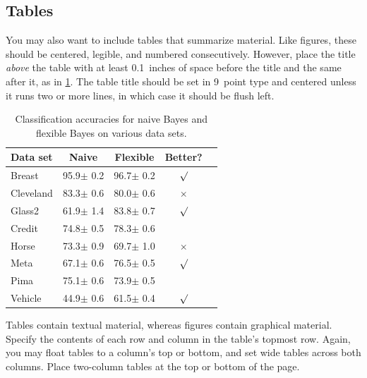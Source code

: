 \documentclass{article}
\newcommand{\abovespace}{\vskip 0.10in}
\newcommand{\belowspace}{\vskip -0.10in}
\theoremstyle{plain}
\theoremstyle{definition}
\theoremstyle{remark}
\begin{document}
\subsection{Tables}

You may also want to include tables that summarize material. Like figures,
these should be centered, legible, and numbered consecutively. However, place
the title \emph{above} the table with at least 0.1~inches of space before the
title and the same after it, as in \cref{sample-table}. The table title should
be set in 9~point type and centered unless it runs two or more lines, in which
case it should be flush left.


\begin{table}[t]
  \caption{Classification accuracies for naive Bayes and flexible
    Bayes on various data sets.}
  \label{sample-table}
  \begin{center}
    \begin{small}
      \begin{sc}
        \begin{tabular}{lcccr}
          \toprule
          Data set  & Naive         & Flexible      & Better?  \\
          \midrule
          Breast    & 95.9$\pm$ 0.2 & 96.7$\pm$ 0.2 & $\surd$  \\
          Cleveland & 83.3$\pm$ 0.6 & 80.0$\pm$ 0.6 & $\times$ \\
          Glass2    & 61.9$\pm$ 1.4 & 83.8$\pm$ 0.7 & $\surd$  \\
          Credit    & 74.8$\pm$ 0.5 & 78.3$\pm$ 0.6 &          \\
          Horse     & 73.3$\pm$ 0.9 & 69.7$\pm$ 1.0 & $\times$ \\
          Meta      & 67.1$\pm$ 0.6 & 76.5$\pm$ 0.5 & $\surd$  \\
          Pima      & 75.1$\pm$ 0.6 & 73.9$\pm$ 0.5 &          \\
          Vehicle   & 44.9$\pm$ 0.6 & 61.5$\pm$ 0.4 & $\surd$  \\
          \bottomrule
        \end{tabular}
      \end{sc}
    \end{small}
  \end{center}
  \vskip -0.1in
\end{table}

Tables contain textual material, whereas figures contain graphical material.
Specify the contents of each row and column in the table's topmost row. Again,
you may float tables to a column's top or bottom, and set wide tables across
both columns. Place two-column tables at the top or bottom of the page.
\end{document}
